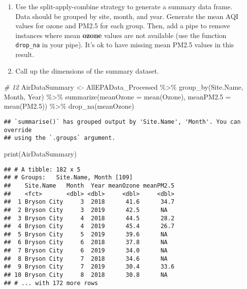 \documentclass[
]{article}
\newenvironment{Shaded}{\begin{snugshade}}{\end{snugshade}}
\newcommand{\AttributeTok}[1]{\textcolor[rgb]{0.77,0.63,0.00}{#1}}
\newcommand{\CommentTok}[1]{\textcolor[rgb]{0.56,0.35,0.01}{\textit{#1}}}
\newcommand{\FloatTok}[1]{\textcolor[rgb]{0.00,0.00,0.81}{#1}}
\newcommand{\FunctionTok}[1]{\textcolor[rgb]{0.00,0.00,0.00}{#1}}
\newcommand{\NormalTok}[1]{#1}
\newcommand{\OtherTok}[1]{\textcolor[rgb]{0.56,0.35,0.01}{#1}}
\newcommand{\SpecialCharTok}[1]{\textcolor[rgb]{0.00,0.00,0.00}{#1}}
\begin{document}
\begin{enumerate}
\def\labelenumi{\arabic{enumi}.}
\setcounter{enumi}{11}
\item
  Use the split-apply-combine strategy to generate a summary data frame.
  Data should be grouped by site, month, and year. Generate the mean AQI
  values for ozone and PM2.5 for each group. Then, add a pipe to remove
  instances where mean \textbf{ozone} values are not available (use the
  function \texttt{drop\_na} in your pipe). It's ok to have missing mean
  PM2.5 values in this result.
\item
  Call up the dimensions of the summary dataset.
\end{enumerate}

\begin{Shaded}
\begin{Highlighting}[]
\CommentTok{\# 12}
\NormalTok{AirDataSummary }\OtherTok{\textless{}{-}}\NormalTok{ AllEPAData\_Processed }\SpecialCharTok{\%\textgreater{}\%}
    \FunctionTok{group\_by}\NormalTok{(Site.Name, Month, Year) }\SpecialCharTok{\%\textgreater{}\%}
    \FunctionTok{summarize}\NormalTok{(}\AttributeTok{meanOzone =} \FunctionTok{mean}\NormalTok{(Ozone), }\AttributeTok{meanPM2.5 =} \FunctionTok{mean}\NormalTok{(PM2}\FloatTok{.5}\NormalTok{)) }\SpecialCharTok{\%\textgreater{}\%}
    \FunctionTok{drop\_na}\NormalTok{(meanOzone)}
\end{Highlighting}
\end{Shaded}

\begin{verbatim}
## `summarise()` has grouped output by 'Site.Name', 'Month'. You can override
## using the `.groups` argument.
\end{verbatim}

\begin{Shaded}
\begin{Highlighting}[]
\FunctionTok{print}\NormalTok{(AirDataSummary)}
\end{Highlighting}
\end{Shaded}

\begin{verbatim}
## # A tibble: 182 x 5
## # Groups:   Site.Name, Month [109]
##    Site.Name   Month  Year meanOzone meanPM2.5
##    <fct>       <dbl> <dbl>     <dbl>     <dbl>
##  1 Bryson City     3  2018      41.6      34.7
##  2 Bryson City     3  2019      42.5      NA  
##  3 Bryson City     4  2018      44.5      28.2
##  4 Bryson City     4  2019      45.4      26.7
##  5 Bryson City     5  2019      39.6      NA  
##  6 Bryson City     6  2018      37.8      NA  
##  7 Bryson City     6  2019      34.0      NA  
##  8 Bryson City     7  2018      34.6      NA  
##  9 Bryson City     7  2019      30.4      33.6
## 10 Bryson City     8  2018      30.8      NA  
## # ... with 172 more rows
\end{verbatim}
\end{document}
